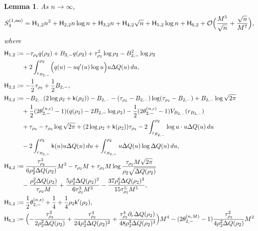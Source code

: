 \documentclass[a4paper]{article}
\newtheorem{lemma}[theorem]{Lemma}
\numberwithin{equation}{section}
\begin{document}
\begin{lemma}\label{lemma: S41 an asymptotics}
As $n\to\infty$,
\begin{equation}
\label{def of S4(1) an}    
S_{4}^{(1,\mathrm{an})}=
\mathsf{H}_{1,2}n^2
+\mathsf{H}_{2,2}n\log n
+\mathsf{H}_{3,2}n
+\mathsf{H}_{4,2}\sqrt{n}
+\mathsf{H}_{5,2}\log n
+\mathsf{H}_{6,2}
+\mathcal{O}\Bigl(\frac{M^5}{\sqrt{n}}+\frac{\sqrt{n}}{M^7}\Bigr),
\end{equation}
where 
\begin{align*}
\mathsf{H}_{1,2}&:= 
-\tau_{\rho_2}q(\rho_2)
+B_{2,-}q(\rho_2)
+\tau_{\rho_2}^2\log \rho_2
-B_{2,-}^2\log\rho_2
\\
&\quad
+2\int_{r_{B_{2,-}}}^{\rho_2}\Bigl(q(u)-uq'(u)\log u
\Bigr)u\Delta Q(u)\,du,
\\
\mathsf{H}_{2,2}&:= 
-\frac{1}{2}\tau_{\rho_2}
+\frac{1}{2}B_{2,-},
\\
\mathsf{H}_{3,2}&:=  
-B_{2,-}(2\log\rho_2+\mathsf{k}(\rho_2))
 -B_{2,-}
-(\tau_{\rho_2}-B_{2,-})\log(\tau_{\rho_2}-B_{2,-})
 +B_{2,-}\log\sqrt{2\pi}
 \\
 &\quad
 +\frac{1}{2}(2\theta_{2,-}^{(n,\epsilon)}-1)(q(\rho_2)-2B_{2,-}\log\rho_2) 
-\frac{1}{2}(2\theta_{2,-}^{(n,\epsilon)}-1)
V_{B_{2,-}}(r_{B_{2,-}})
\\
&\quad
 +\tau_{\rho_2}
-\tau_{\rho_2}\log\sqrt{2\pi}  
+(2\log\rho_2+\mathsf{k}(\rho_2))\tau_{\rho_2}
-2\int_{r_{B_{2,-}}}^{\rho_2}\log u\cdot u\Delta Q(u)\,du
\\
&\quad
-2\int_{r_{B_{2,-}}}^{\rho_2}\mathsf{k}(u)u\Delta Q(u)\,du
+\int_{r_{B_{2,-}}}^{\rho_2}u\Delta Q(u)\log \Delta Q(u)\,du,
\\
\mathsf{H}_{4,2}&:= 
\frac{\tau_{\rho_2}^3}{6\rho_2^2\Delta Q(\rho_2)}M^3
 -\tau_{\rho_2}M
+\tau_{\rho_2}M\log \frac{\tau_{\rho_2}M\sqrt{2\pi}}{\rho_2\sqrt{\Delta Q(\rho_2)}}
     \\
     &\quad
     -\frac{\rho_2^2\Delta Q(\rho_2)}{\tau_{\rho_2}M}
     +\frac{5\rho_2^4\Delta Q(\rho_2)^2}{6\tau_{\rho_2}^3M^3}
     -\frac{37\rho_2^6\Delta Q(\rho_2)^3}{15\tau_{\rho_2}^5M^5}, 
\\
\mathsf{H}_{5,2}&:=  
\frac{1}{2}\theta_{2,-}^{(n,\epsilon)}
+\frac{1}{4}+\frac{1}{4}\rho_2\mathsf{k}'(\rho_2), 
\\
\mathsf{H}_{6,2}&:= 
\Bigl( 
-\frac{\tau_{\rho_2}^3}{2\rho_2^2\Delta Q(\rho_2)}
+\frac{\tau_{\rho_2}^4}{24\rho_2^4\Delta Q(\rho_2)^2}
+\frac{\tau_{\rho_2}^4\partial_r\Delta Q(\rho_2)}{48\rho_2^3\Delta Q(\rho_2)^3}
\Bigr)M^4
-(2\theta_{2,-}^{(n,M)}-1)
\frac{\tau_{\rho_2}^2}{4\rho_2^2\Delta Q(\rho_2)}M^2

\end{align*}
\end{lemma}
\end{document}
